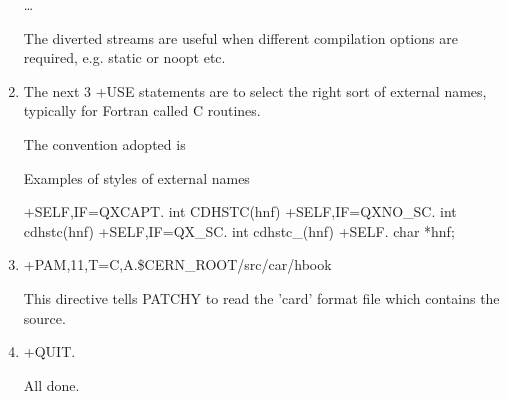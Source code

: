 \begin{enumerate}
\ldots

The diverted streams are useful when different compilation options are
required, e.g. static or noopt etc.

\item
The next 3 +USE statements are to select the right sort
of external names, typically for Fortran called C routines.

The convention adopted is


\begin{XMPt}{Examples of styles of external names}

+SELF,IF=QXCAPT.
int CDHSTC(hnf)
+SELF,IF=QXNO_SC.
int cdhstc(hnf)
+SELF,IF=QX_SC.
int cdhstc_(hnf)
+SELF.
char *hnf;

\end{XMPt}

\item
+PAM,11,T=C,A.\$CERN\_ROOT/src/car/hbook

This directive tells PATCHY to read the 'card' format file which 
contains the \HBOOK{} source.

\item
+QUIT.

All done.

\end{enumerate}

